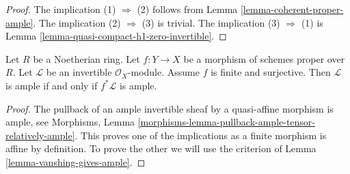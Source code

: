 \begin{proof}
The implication (1) $\Rightarrow$ (2) follows from
Lemma \ref{lemma-coherent-proper-ample}.
The implication (2) $\Rightarrow$ (3) is trivial.
The implication (3) $\Rightarrow$ (1) is
Lemma \ref{lemma-quasi-compact-h1-zero-invertible}.
\end{proof}

\begin{lemma}
\label{lemma-surjective-finite-morphism-ample}
Let $R$ be a Noetherian ring. Let $f : Y \to X$ be a morphism of
schemes proper over $R$. Let $\mathcal{L}$ be an
invertible $\mathcal{O}_X$-module. Assume $f$ is finite and surjective.
Then $\mathcal{L}$ is ample if and only if $f^*\mathcal{L}$ is ample.
\end{lemma}

\begin{proof}
The pullback of an ample invertible sheaf by a quasi-affine morphism
is ample, see Morphisms, Lemma
\ref{morphisms-lemma-pullback-ample-tensor-relatively-ample}.
This proves one of the implications as a finite morphism is affine
by definition. To prove the other we will use
the criterion of Lemma \ref{lemma-vanshing-gives-ample}.


\end{proof}
